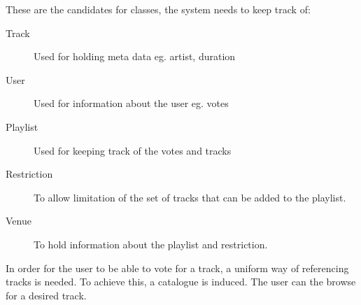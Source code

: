 These are the candidates for classes, the system needs to keep track of:
\begin{description}
	\item[Track]
	
	Used for holding meta data eg. artist, duration
	\item[User]
	
	Used for information about the user eg. votes
	\item[Playlist]
	
	Used for keeping track of the votes and tracks
	\item[Restriction] 
	
	To allow limitation of the set of tracks that can be added to the playlist.
	\item[Venue]
	
	To hold information about the playlist and restriction.
\end{description}

In order for the user to be able to vote for a track, a uniform way of referencing tracks is needed. To achieve this, a catalogue is induced. The user can the browse for a desired track.